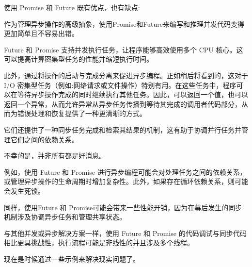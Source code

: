 使用 Promise 和 Future 既有优点，也有缺点:


作为管理异步操作的高级抽象，使用Promise和Future来编写和推理并发代码变得更加简单且不容易出错。

Future 和 Promise 支持并发执行任务，让程序能够高效使用多个 CPU 核心。这可以提高计算密集型任务的性能并缩短执行时间。

此外，通过将操作的启动与完成分离来促进异步编程。正如稍后将看到的，这对于 I/O 密集型任务（例如:网络请求或文件操作）特别有用。在这些任务中，程序可以在等待异步操作完成的同时继续执行其他任务。因此，可以返回一个值，也可以返回一个异常，从而允许异常从异步任务传播到等待其完成的调用者代码部分，从而为错误处理和恢复提供了一种更清晰的方式。

它们还提供了一种同步任务完成和检索其结果的机制，这有助于协调并行任务并管理它们之间的依赖关系。


不幸的是，并非所有都是好消息。

例如，使用 Future 和 Promise 进行异步编程可能会对处理任务之间的依赖关系，或管理异步操作的生命周期时增加复杂性。此外，如果存在循环依赖关系，则可能会发生死锁。

同样，使用Future 和 Promise可能会带来一些性能开销，因为在幕后发生的同步机制涉及协调异步任务和管理共享状态。

与其他并发或异步解决方案一样，使用 Future 和 Promise 的代码调试与同步代码相比更具挑战性，执行流程可能是非线性的并且涉及多个线程。

现在是时候通过一些示例来解决现实问题了。